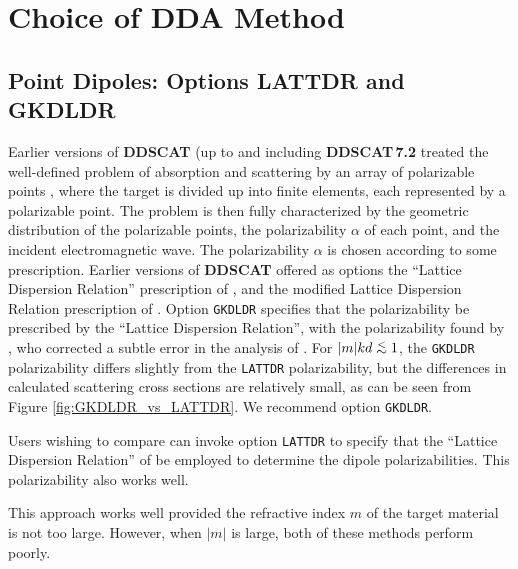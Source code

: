 \section{Choice of DDA Method\label{sec:DDA_method}}

\subsection{Point Dipoles: Options LATTDR and GKDLDR}

Earlier versions of {\bf DDSCAT} (up to and including {\bf DDSCAT\,7.2}
treated the well-defined problem
of absorption and scattering by an array of polarizable points
\citep{Purcell+Pennypacker_1973,Draine_1988,Draine+Flatau_1994}, where
the target is divided up into finite elements, each represented by
a polarizable point.
The problem is then fully characterized by the geometric distribution of
the polarizable points, the polarizability $\alpha$ of each point,
and the incident electromagnetic wave.
The polarizability $\alpha$ is chosen according to some prescription.
Earlier versions of {\bf DDSCAT} offered as options the ``Lattice Dispersion
Relation'' prescription of
\citet{Draine+Goodman_1993}, and the modified Lattice Dispersion Relation
prescription of \citet{Gutkowicz-Krusin+Draine_2004}.
Option {\tt GKDLDR} specifies that the polarizability be prescribed
by the ``Lattice Dispersion Relation'', with the polarizability
found by \citet{Gutkowicz-Krusin+Draine_2004}, 
who corrected a subtle error in
the analysis of \citet{Draine+Goodman_1993}.
For $|m|kd\ltsim 1$, 
the {\tt GKDLDR}  polarizability differs slightly from the {\tt LATTDR} 
polarizability, but the differences in calculated scattering cross sections
are relatively small, as can be seen from Figure \ref{fig:GKDLDR_vs_LATTDR}.
We recommend option {\tt GKDLDR}.

Users wishing to compare can invoke option {\tt LATTDR} to specify that the 
``Lattice Dispersion Relation'' of \citet{Draine+Goodman_1993}
be employed to determine the dipole
polarizabilities.
This polarizability also works well.


This approach works well provided the refractive index $m$ of the
target material is not too large.  However, when $|m|$ is large,
both of these methods perform poorly.

